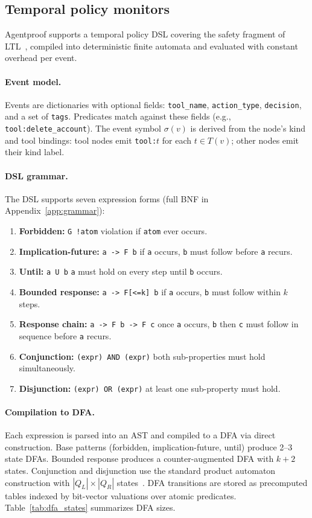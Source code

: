 \subsection{Temporal policy monitors}
Agentproof supports a temporal policy DSL covering the safety fragment of
LTL~\citep{pnueli1977temporal}, compiled into deterministic finite
automata and evaluated with constant overhead per event.

\paragraph{Event model.}
Events are dictionaries with optional fields: \texttt{tool\_name},
\texttt{action\_type}, \texttt{decision}, and a set of \texttt{tags}.
Predicates match against these fields (e.g., \texttt{tool:delete\_account}).
The event symbol $\sigma(v)$ is derived from the node's kind and tool
bindings: tool nodes emit \texttt{tool:$t$} for each $t \in T(v)$;
other nodes emit their kind label.

\paragraph{DSL grammar.}
The DSL supports seven expression forms (full BNF in
Appendix~\ref{app:grammar}):
\begin{enumerate}
  \item \textbf{Forbidden:} \texttt{G !atom}   violation if
    \texttt{atom} ever occurs.
  \item \textbf{Implication-future:} \texttt{a -> F b}   if \texttt{a}
    occurs, \texttt{b} must follow before \texttt{a} recurs.
  \item \textbf{Until:} \texttt{a U b}   \texttt{a} must hold on every
    step until \texttt{b} occurs.
  \item \textbf{Bounded response:} \texttt{a -> F[<=k] b}   if
    \texttt{a} occurs, \texttt{b} must follow within $k$ steps.
  \item \textbf{Response chain:} \texttt{a -> F b -> F c}   once
    \texttt{a} occurs, \texttt{b} then \texttt{c} must follow in
    sequence before \texttt{a} recurs.
  \item \textbf{Conjunction:} \texttt{(expr) AND (expr)}   both
    sub-properties must hold simultaneously.
  \item \textbf{Disjunction:} \texttt{(expr) OR (expr)}   at least
    one sub-property must hold.
\end{enumerate}

\paragraph{Compilation to DFA.}
Each expression is parsed into an AST and compiled to a DFA via
direct construction. Base patterns (forbidden, implication-future,
until) produce 2--3 state DFAs. Bounded response produces a
counter-augmented DFA with $k+2$ states. Conjunction and disjunction
use the standard product automaton construction with
$|Q_L| \times |Q_R|$ states~\citep{vardi1994automata}. DFA transitions
are stored as precomputed tables indexed by bit-vector valuations over
atomic predicates. Table~\ref{tab:dfa_states} summarizes DFA sizes.

